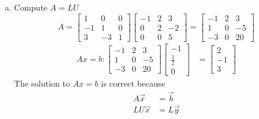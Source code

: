 \documentclass[12pt, letterpaper]{article}
\begin{document}
\begin{enumerate}
\begin{enumerate}[(a)]
            \item Compute $A=LU$
                \[
                    A =
                    \begin{bmatrix}
                        1 & 0 & 0 \\
                        -1 & 1 & 0 \\
                        3 & -3 & 1
                    \end{bmatrix}
                    \begin{bmatrix}
                        -1 & 2 & 3 \\
                        0 & 2 & -2 \\
                        0 & 0 & 5
                    \end{bmatrix}
                    = 
                    \begin{bmatrix}
                        -1 & 2 & 3 \\
                        1 & 0 & -5 \\
                        -3 & 0 & 20
                    \end{bmatrix}
                \]
                \begin{align*}
                    Ax=b : 
                    \begin{bmatrix}
                        -1 & 2 & 3 \\
                        1 & 0 & -5 \\
                        -3 & 0 & 20
                    \end{bmatrix}
                    \begin{bmatrix}
                        -1 \\
                        \frac{1}{2} \\
                        0
                    \end{bmatrix}
                    &=
                    \begin{bmatrix}
                        2 \\
                        -1 \\
                        3
                    \end{bmatrix} 
                \end{align*}
                The solution to $Ax=b$ is correct because \begin{align*}
                    A\vec x &= \vec b \\ 
                    LU\vec x & = L \vec y \\

\end{align*}
\end{enumerate}
\end{enumerate}
\end{document}
